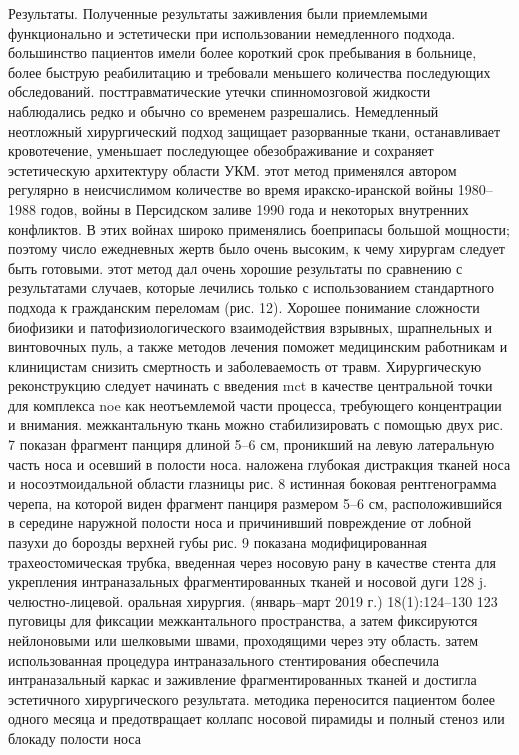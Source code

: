 Результаты. Полученные результаты заживления были приемлемыми функционально и
эстетически при использовании немедленного подхода. большинство пациентов имели
более короткий срок пребывания в больнице, более быструю реабилитацию и
требовали меньшего количества последующих обследований. посттравматические
утечки спинномозговой жидкости наблюдались редко и обычно со временем
разрешались. Немедленный неотложный хирургический подход защищает разорванные
ткани, останавливает кровотечение, уменьшает последующее обезображивание и
сохраняет эстетическую архитектуру области УКМ. этот метод применялся автором
регулярно в неисчислимом количестве во время иракско-иранской войны 1980–1988
годов, войны в Персидском заливе 1990 года и некоторых внутренних конфликтов. В
этих войнах широко применялись боеприпасы большой мощности; поэтому число
ежедневных жертв было очень высоким, к чему хирургам следует быть готовыми. этот
метод дал очень хорошие результаты по сравнению с результатами случаев, которые
лечились только с использованием стандартного подхода к гражданским переломам
(рис. 12). Хорошее понимание сложности биофизики и патофизиологического
взаимодействия взрывных, шрапнельных и винтовочных пуль, а также методов лечения
поможет медицинским работникам и клиницистам снизить смертность и заболеваемость
от травм. Хирургическую реконструкцию следует начинать с введения mct в качестве
центральной точки для комплекса noe как неотъемлемой части процесса, требующего
концентрации и внимания. межкантальную ткань можно стабилизировать с помощью
двух рис. 7 показан фрагмент панциря длиной 5–6 см, проникший на левую
латеральную часть носа и осевший в полости носа. наложена глубокая дистракция
тканей носа и носоэтмоидальной области глазницы рис. 8 истинная боковая
рентгенограмма черепа, на которой виден фрагмент панциря размером 5–6 см,
расположившийся в середине наружной полости носа и причинивший повреждение от
лобной пазухи до борозды верхней губы рис. 9 показана модифицированная
трахеостомическая трубка, введенная через носовую рану в качестве стента для
укрепления интраназальных фрагментированных тканей и носовой дуги 128 j.
челюстно-лицевой. оральная хирургия. (январь–март 2019 г.) 18(1):124–130 123
пуговицы для фиксации межкантального пространства, а затем фиксируются
нейлоновыми или шелковыми швами, проходящими через эту область. затем
использованная процедура интраназального стентирования обеспечила интраназальный
каркас и заживление фрагментированных тканей и достигла эстетичного
хирургического результата. методика переносится пациентом более одного месяца и
предотвращает коллапс носовой пирамиды и полный стеноз или блокаду полости носа
